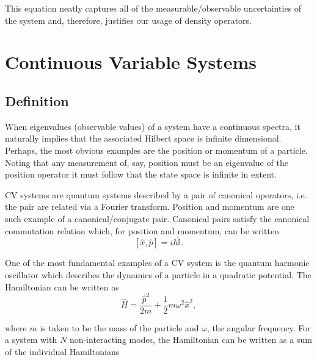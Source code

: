 \documentclass[11pt,a4paper]{article}
\numberwithin{equation}{section}
\begin{document}
	This equation neatly captures all of the measurable/observable uncertainties of the system and, therefore, justifies our usage of density operators.
	
	
	\section{Continuous Variable Systems}
	\label{sec:cvs}
	
	\subsection{Definition}
	When eigenvalues (observable values) of a system have a continuous spectra, it naturally implies that the associated Hilbert space is infinite dimensional. Perhaps, the most obvious examples are the position or momentum of a particle. Noting that any measurement of, say, position must be an eigenvalue of the position operator it must follow that the state space is infinite in extent. 
	
	CV systems are quantum systems described by a pair of canonical operators, i.e. the pair are related via a Fourier transform. Position and momentum are one such example of a canonical/conjugate pair. Canonical pairs satisfy the canonical commutation relation which, for position and momentum, can be written \cite{Serafini05}
	\begin{equation} \label{eq:6}
	[\hat{x}, \hat{p}] = i\hbar\hat{\mathbb{I}}.
	\end{equation}
	
	One of the most fundamental examples of a CV system is the quantum harmonic oscillator which describes the dynamics of a particle in a quadratic potential. The Hamiltonian can be written as \cite{Adesso14, Braunstein}
	\begin{equation} \label{eq:7}
	\hat{H} = \frac{\hat{p}^2}{2m} + \frac{1}{2} m\omega^2\hat{x}^2,
	\end{equation}
	
	where $m$ is taken to be the mass of the particle and $\omega$, the angular frequency. For a system with $N$ non-interacting modes, the Hamiltonian can be written as a sum of the individual Hamiltonians 
	
\end{document}
